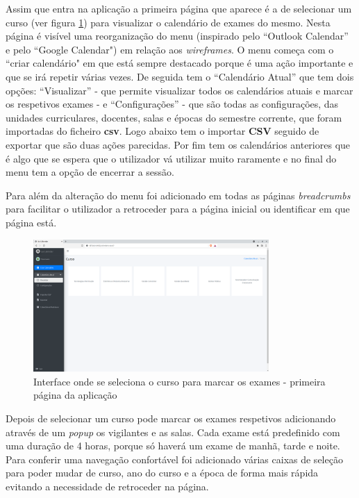 \documentclass[11pt, twoside]{report}
\begin{document}
	Assim que entra na aplicação a primeira página que aparece é a de selecionar um curso (ver figura \ref{selecionarCurso}) para visualizar o calendário de exames do mesmo. Nesta página é visível uma reorganização do menu (inspirado pelo ``Outlook Calendar'' e pelo ``Google Calendar") em relação aos \textit{wireframes}.
	O menu começa com o ``criar calendário" em que está sempre destacado porque é uma ação importante e que se irá repetir várias vezes. De seguida tem o ``Calendário Atual'' que tem dois opções: ``Visualizar'' - que permite visualizar todos os calendários atuais e marcar os respetivos exames - e ``Configurações'' - que são todas as configurações, das unidades curriculares, docentes, salas e épocas do semestre corrente, que foram importadas do ficheiro \textbf{csv}.
	Logo abaixo tem o importar \textbf{CSV} seguido de exportar que são duas ações parecidas.
	Por fim tem os calendários anteriores que é algo que se espera que o utilizador vá utilizar muito raramente e no final do menu tem a opção de encerrar a sessão.
	
	Para além da alteração do menu foi adicionado em todas as páginas \textit{breadcrumbs} para facilitar o utilizador a retroceder para a página inicial ou identificar em que página está.  
	
	\begin{figure}[H] 
		\centering 							\includegraphics[width=0.8\textwidth,height=0.8\textheight,keepaspectratio]{image/PrototipoAFNF/VisualizarCalendario}
		\caption{Interface onde se seleciona o curso para marcar os exames - primeira página da aplicação}
		\label{selecionarCurso}
	\end{figure}

	Depois de selecionar um curso pode marcar os exames respetivos adicionando através de um \textit{popup} os vigilantes e as salas. Cada exame está predefinido com uma duração de 4 horas, porque só haverá um exame de manhã, tarde e noite.
	Para conferir uma navegação confortável foi adicionado várias caixas de seleção para poder mudar de curso, ano do curso e a época de forma mais rápida evitando a necessidade de retroceder na página. 
\end{document}
